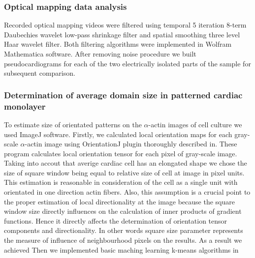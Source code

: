 \subsubsection{Optical mapping data analysis}
Recorded optical mapping videos were filtered using temporal 5 iteration 8-term Daubechies wavelet low-pass shrinkage filter and spatial smoothing three level Haar wavelet filter. Both filtering algorithms were implemented in Wolfram Mathematica software. After removing noise procedure we built pseudocardiograms for each of the two electrically isolated parts of the sample for subsequent comparison. 
\subsubsection{Determination of average domain size in patterned cardiac monolayer}  
To estimate size of orientated patterns on the $\alpha$-actin images of cell culture we used ImageJ software. Firstly, we calculated local orientation maps for each gray-scale $\alpha$-actin image using OrientationJ plugin thoroughly described in\cite{Bouten2011}. These program calculates local orientation tensor for each pixel of gray-scale image. Taking into accout that averige cardiac cell has an elongated shape we chose the size of square window being equal to relative size of cell at image in pixel units. This estimation is reasonable in consideration of the cell as a single unit with orientated in one direction actin fibers. Also, this assumption is a crucial point to the proper estimation of local directionality at the image because the square window size directly influences on the calculation of inner products of gradient functions. Hence it directly affects the determination of orientation tensor components and directionality. In other words square size parameter represents the measure of influence of neighbourhood pixels on the results.       As a result we achieved    
Then we implemented basic maching learning k-means algorithms in 

